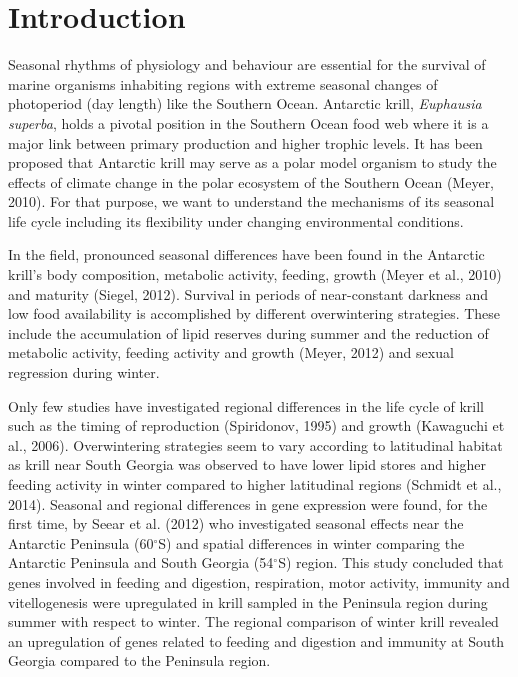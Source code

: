 \section{Introduction}

Seasonal rhythms of physiology and behaviour are essential for the survival of
marine organisms inhabiting regions with extreme seasonal changes of
photoperiod (day length) like the Southern Ocean. Antarctic krill,
\textit{Euphausia superba}, holds a pivotal position in the Southern Ocean food
web where it is a major link between primary production and higher trophic
levels. It has been proposed that Antarctic krill may serve as a polar model
organism to study the effects of climate change in the polar ecosystem of the
Southern Ocean (Meyer, 2010). For that purpose, we want to understand the
mechanisms of its seasonal life cycle including its flexibility under changing
environmental conditions.

In the field, pronounced seasonal differences have been found in the Antarctic
krill's body composition, metabolic activity, feeding, growth (Meyer et al.,
2010) and maturity (Siegel, 2012). Survival in periods of near-constant
darkness and low food availability is accomplished by different overwintering
strategies. These include the accumulation of lipid reserves during summer and
the reduction of metabolic activity, feeding activity and growth (Meyer, 2012)
and sexual regression during winter.

Only few studies have investigated regional differences in the life cycle of
krill such as the timing of reproduction (Spiridonov, 1995) and growth
(Kawaguchi et al., 2006). Overwintering strategies seem to vary according to
latitudinal habitat as krill near South Georgia was observed to have lower
lipid stores and higher feeding activity in winter compared to higher
latitudinal regions (Schmidt et al., 2014). Seasonal and regional differences
in gene expression were found, for the first time, by Seear et al. (2012) who
investigated seasonal effects near the Antarctic Peninsula (60$^{\circ}$S) and
spatial differences in winter comparing the Antarctic Peninsula and South
Georgia (54$^{\circ}$S) region. This study concluded that genes involved in
feeding and digestion, respiration, motor activity, immunity and vitellogenesis
were upregulated in krill sampled in the Peninsula region during summer with
respect to winter. The regional comparison of winter krill revealed an
upregulation of genes related to feeding and digestion and immunity at South
Georgia compared to the Peninsula region.

